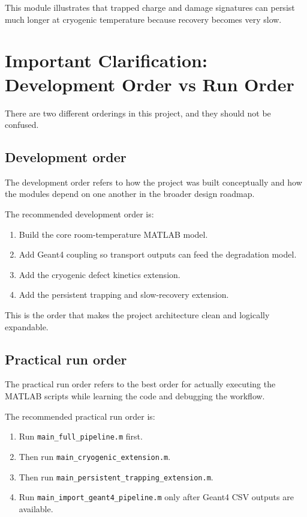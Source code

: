 \documentclass[11pt]{article}
\begin{document}
This module illustrates that trapped charge and damage signatures can persist much longer at cryogenic temperature because recovery becomes very slow.

\section{Important Clarification: Development Order vs Run Order}
There are two different orderings in this project, and they should not be confused.

\subsection{Development order}
The development order refers to how the project was built conceptually and how the modules depend on one another in the broader design roadmap.

The recommended development order is:
\begin{enumerate}[leftmargin=2em]
    \item Build the core room-temperature MATLAB model.
    \item Add Geant4 coupling so transport outputs can feed the degradation model.
    \item Add the cryogenic defect kinetics extension.
    \item Add the persistent trapping and slow-recovery extension.
\end{enumerate}

This is the order that makes the project architecture clean and logically expandable.

\subsection{Practical run order}
The practical run order refers to the best order for actually executing the MATLAB scripts while learning the code and debugging the workflow.

The recommended practical run order is:
\begin{enumerate}[leftmargin=2em]
    \item Run \texttt{main\_full\_pipeline.m} first.
    \item Then run \texttt{main\_cryogenic\_extension.m}.
    \item Then run \texttt{main\_persistent\_trapping\_extension.m}.
    \item Run \texttt{main\_import\_geant4\_pipeline.m} only after Geant4 CSV outputs are available.
\end{enumerate}
\end{document}
